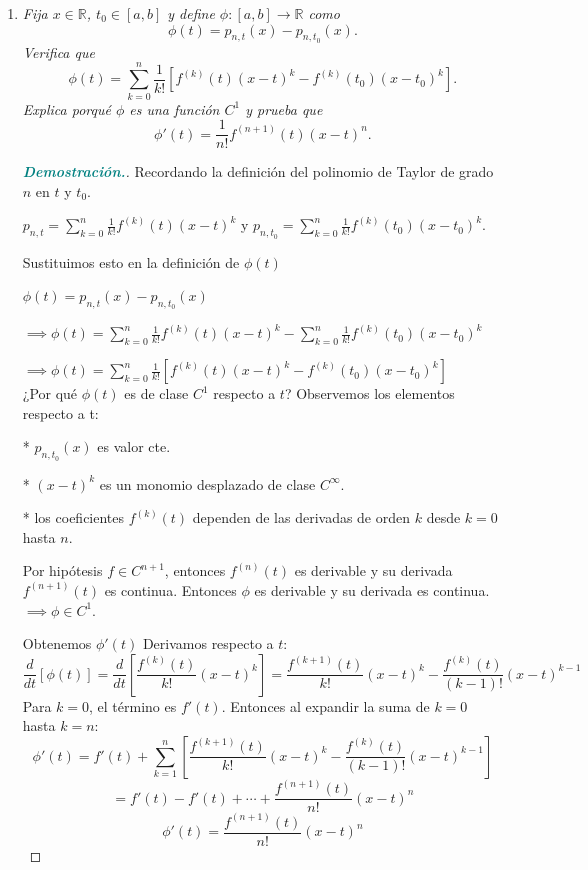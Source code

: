 \documentclass[12pt, letterpaper]{article}
\begin{document}
\begin{enumerate}[label=(\alph*)]
    \item \textit{Fija $x \in \mathbb{R}$, $t_0 \in [a,b]$ y define $\phi : [a,b] \to \mathbb{R}$ como}
    \[ \phi(t) = p_{n,t}(x) - p_{n,t_0}(x). \]
    \textit{Verifica que}
    \[ \phi(t) = \sum_{k=0}^{n} \frac{1}{k!} \left[ f^{(k)}(t)(x - t)^k - f^{(k)}(t_0)(x - t_0)^k \right]. \]
    \textit{Explica porqué $\phi$ es una función $C^1$ y prueba que}
    \[ \phi'(t) = \frac{1}{n!}f^{(n+1)}(t)(x - t)^n. \]
    
    \begin{proof}[\textbf{\textcolor{teal}{Demostración.}}]
        Recordando la definición del polinomio de Taylor de grado $n$ en $t$ y $t_0$.
        
        $p_{n,t} = \sum_{k=0}^{n} \frac{1}{k!} f^{(k)}(t)(x-t)^k$ y $p_{n,t_0} = \sum_{k=0}^{n} \frac{1}{k!} f^{(k)}(t_0)(x-t_0)^k$. 
        
        Sustituimos esto en la definición de $\phi(t)$
        
        \begin{center}
            $\phi(t) = p_{n,t}(x) - p_{n,t_0}(x)$
        \end{center}
        
        $\implies \phi(t) = \sum_{k=0}^{n} \frac{1}{k!} f^{(k)}(t)(x-t)^k - \sum_{k=0}^{n} \frac{1}{k!} f^{(k)}(t_0)(x-t_0)^k$
        
        $\implies \phi(t) = \sum_{k=0}^{n} \frac{1}{k!} [f^{(k)}(t)(x-t)^k - f^{(k)}(t_0)(x-t_0)^k]$\\
        
        ¿Por qué $\phi(t)$ es de clase $C^1$ respecto a $t$?
        Observemos los elementos respecto a t:
        
        * $p_{n,t_0}(x)$ es valor cte.
        
        * $(x-t)^k$ es un monomio desplazado de clase $C^\infty$.
        
        * los coeficientes $f^{(k)}(t)$ dependen de las derivadas de orden $k$ desde $k=0$ hasta $n$.
        
        Por hipótesis $f \in C^{n+1}$, entonces $f^{(n)}(t)$ es derivable y su derivada $f^{(n+1)}(t)$ es continua. Entonces $\phi$ es derivable y su derivada es continua. $\implies \phi \in C^1$.
        
        Obtenemos $\phi'(t)$
        Derivamos respecto a $t$:
        \[ \frac{d}{dt} [ \phi(t) ] = \frac{d}{dt} \left[ \frac{f^{(k)}(t)}{k!}(x-t)^k \right] = \frac{f^{(k+1)}(t)}{k!}(x-t)^k - \frac{f^{(k)}(t)}{(k-1)!}(x-t)^{k-1} \]
        Para $k=0$, el término es $f'(t)$. Entonces al expandir la suma de $k=0$ hasta $k=n$:
        \[ \phi'(t) = f'(t) + \sum_{k=1}^{n} \left[ \frac{f^{(k+1)}(t)}{k!}(x-t)^k - \frac{f^{(k)}(t)}{(k-1)!}(x-t)^{k-1} \right] \]
        \[ = f'(t) - f'(t) + \cdots + \frac{f^{(n+1)}(t)}{n!}(x-t)^n \]
        \[ \phi'(t) = \frac{f^{(n+1)}(t)}{n!}(x-t)^n \]
    \end{proof}


\end{enumerate}
\end{document}
